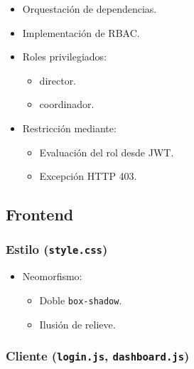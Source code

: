 \documentclass[12pt,letterpaper]{article}
\begin{document}
\begin{itemize}
    \item Orquestación de dependencias.
    \item Implementación de RBAC.
    \item Roles privilegiados:
    \begin{itemize}
        \item director.
        \item coordinador.
    \end{itemize}
    \item Restricción mediante:
    \begin{itemize}
        \item Evaluación del rol desde JWT.
        \item Excepción HTTP 403.
    \end{itemize}
\end{itemize}

\subsection{Frontend}

\subsubsection{Estilo (\texttt{style.css})}

\begin{itemize}
    \item Neomorfismo:
    \begin{itemize}
        \item Doble \texttt{box-shadow}.
        \item Ilusión de relieve.
    \end{itemize}
\end{itemize}

\subsubsection{Cliente (\texttt{login.js}, \texttt{dashboard.js})}
\end{document}
